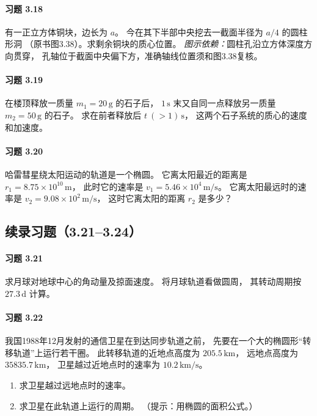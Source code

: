 \paragraph{习题 3.18}
有一正立方体铜块，边长为 \(a\)。
今在其下半部中央挖去一截面半径为 \(a/4\) 的圆柱形洞
（原书图3.38）。求剩余铜块的质心位置。
\textit{图示依赖：}圆柱孔沿立方体深度方向贯穿，
孔轴位于截面中央偏下方，准确轴线位置须和图3.38复核。

\paragraph{习题 3.19}
在楼顶释放一质量 \(m_1=20\,\mathrm g\) 的石子后，
\(1\,\mathrm s\) 末又自同一点释放另一质量
\(m_2=50\,\mathrm g\) 的石子。
求在前者释放后 \(t\ (>1)\,\mathrm s\)，
这两个石子系统的质心的速度和加速度。

\paragraph{习题 3.20}
哈雷彗星绕太阳运动的轨道是一个椭圆。
它离太阳最近的距离是
\(r_1=8.75\times10^{10}\,\mathrm m\)，
此时它的速率是
\(v_1=5.46\times10^4\,\mathrm{m/s}\)。
它离太阳最远时的速率是
\(v_2=9.08\times10^2\,\mathrm{m/s}\)，
这时它离太阳的距离 \(r_2\) 是多少？


\subsection*{续录习题（3.21--3.24）}

\paragraph{习题 3.21}
求月球对地球中心的角动量及掠面速度。
将月球轨道看做圆周，
其转动周期按 \(27.3\,\mathrm d\) 计算。

\paragraph{习题 3.22}
我国1988年12月发射的通信卫星在到达同步轨道之前，
先要在一个大的椭圆形“转移轨道”上运行若干圈。
此转移轨道的近地点高度为 \(205.5\,\mathrm{km}\)，
远地点高度为 \(35835.7\,\mathrm{km}\)，
卫星越过近地点时的速率为 \(10.2\,\mathrm{km/s}\)。
\begin{enumerate}
\item 求卫星越过远地点时的速率。
\item 求卫星在此轨道上运行的周期。
（提示：用椭圆的面积公式。）
\end{enumerate}

